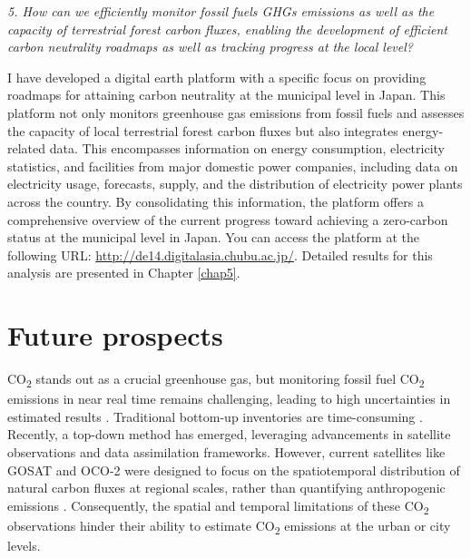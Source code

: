 \textit{5. How can we efficiently monitor fossil fuels GHGs emissions as well as the capacity of terrestrial forest carbon fluxes, enabling the development of efficient carbon neutrality roadmaps as well as tracking progress at the local level?} \par
I have developed a digital earth platform with a specific focus on providing roadmaps for attaining carbon neutrality at the municipal level in Japan. This platform not only monitors greenhouse gas emissions from fossil fuels and assesses the capacity of local terrestrial forest carbon fluxes but also integrates energy-related data. This encompasses information on energy consumption, electricity statistics, and facilities from major domestic power companies, including data on electricity usage, forecasts, supply, and the distribution of electricity power plants across the country. By consolidating this information, the platform offers a comprehensive overview of the current progress toward achieving a zero-carbon status at the municipal level in Japan. You can access the platform at the following URL: \url{http://de14.digitalasia.chubu.ac.jp/}. Detailed results for this analysis are presented in Chapter \ref{chap5}. \par

\section{Future prospects}
CO\textsubscript{2} stands out as a crucial greenhouse gas, but monitoring fossil fuel CO\textsubscript{2} emissions in near real time remains challenging, leading to high uncertainties in estimated results \citep{marland2008uncertainties}. Traditional bottom-up inventories are time-consuming \citep{marland2008uncertainties}. Recently, a top-down method has emerged, leveraging advancements in satellite observations and data assimilation frameworks. However, current satellites like GOSAT and OCO-2 were designed to focus on the spatiotemporal distribution of natural carbon fluxes at regional scales, rather than quantifying anthropogenic emissions \citep{nassar2017quantifying, yang2023using}. Consequently, the spatial and temporal limitations of these CO\textsubscript{2} observations hinder their ability to estimate CO\textsubscript{2} emissions at the urban or city levels. \par

